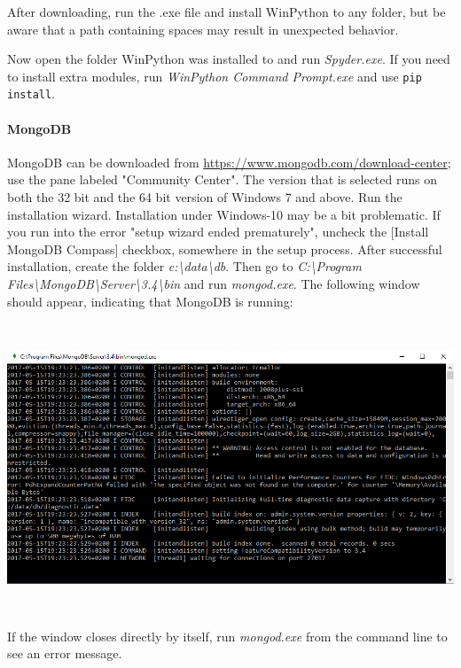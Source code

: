 \documentclass[a4paper]{report}
\begin{document}
After downloading, run the .exe file and install WinPython to any
folder, but be aware that a path containing spaces may result in
unexpected behavior.

Now open the folder WinPython was installed to and run
\textit{Spyder.exe}. If you need to install extra modules, run
\textit{WinPython Command Prompt.exe} and use \small\texttt{pip install}.

\paragraph{MongoDB}
MongoDB can be downloaded from
\url{https://www.mongodb.com/download-center}; use the pane labeled
"Community Center". The version that is
selected runs on both the 32 bit and the 64 bit version of Windows 7
and above. Run the installation wizard. Installation under Windows-10 may be
a bit problematic. If you run into the error "setup wizard ended
prematurely", uncheck the [Install MongoDB Compass] checkbox, somewhere in
the setup process. After successful installation, create the folder
\textit{c:{\textbackslash}data{\textbackslash}db}. Then go to
\textit{C:{\textbackslash}Program
Files{\textbackslash}MongoDB{\textbackslash}Server{\textbackslash}3.4{\textbackslash}bin}
and run \textit{mongod.exe}. The following window should appear,
indicating that MongoDB is running:

\noindent\begin{center}\includegraphics[width=6.4925in,height=3.3957in]{Syllabus-img5.png}
\end{center}

If the window closes directly by itself, run \textit{mongod.exe} from
the command line to see an error message.
\end{document}
